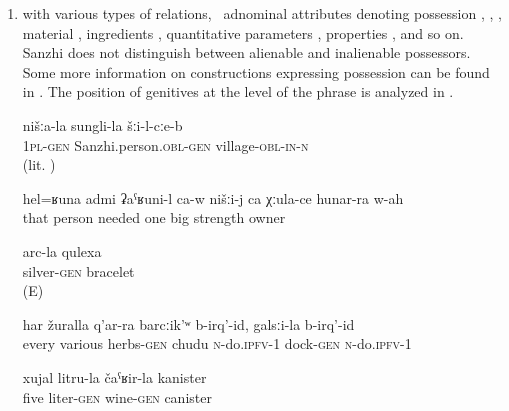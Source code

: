 \begin{enumerate}
	\item	with various types of relations, \teg\ adnominal attributes denoting possession , , , material , ingredients , quantitative parameters , properties , and so on. Sanzhi does not distinguish between alienable and inalienable possessors. Some more information on constructions expressing possession can be found in . The position of genitives at the level of the phrase is analyzed in .
	\begin{exe}
	
		\ex	\label{ex:in our village of Sanzhi}
		\gll	nišːa-la	sungli-la	šːi-l-cːe-b\\
			\textsc{1pl-gen}	Sanzhi.person.\textsc{obl}-\textsc{gen}	village-\textsc{obl-in}-\textsc{n}\\
		\glt	{} (lit. )
		
		
	\ex	\label{ex:‎We need such a man, one with huge strength}
	\gll	hel=ʁuna	admi	ʡaˁʁuni-l	ca-w	nišːi-j	ca	χːula-ce	hunar-ra w-ah\\
		that	person	needed				one	big	strength	owner\\
	\glt	{}
		
		
		\ex	\label{ex:silver bracelet}
		\gll	arc-la qulexa\\
			silver-\textsc{gen} bracelet\\
		\glt	{} (E)

		\ex	\label{ex:We make chudu from all various herbs, we make it from dock}
		\gll	har	žuralla	q'ar-ra	barcːik'ʷ	b-irq'-id,	galsːi-la	b-irq'-id\\
			every	various	herbs-\textsc{gen}	chudu	\textsc{n}-do.\textsc{ipfv}-1	dock-\textsc{gen}	\textsc{n}-do.\textsc{ipfv}-1\\
		\glt	{}

		\ex	\label{ex:five liter canister of wine}
		\gll	xujal	litru-la		čaˁʁir-la	kanister\\
			five	liter-\textsc{gen}	wine-\textsc{gen}	canister\\
		\glt	{}


\end{exe}
\end{enumerate}
